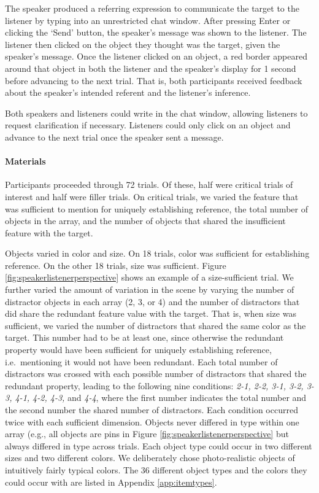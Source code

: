 \documentclass[11pt]{article}
\newcommand{\figref}[1]{Figure \ref{#1}}
\newcommand{\appref}[1]{Appendix \ref{#1}}
\begin{document}
The speaker produced a referring expression to communicate the target to the listener by typing into an unrestricted chat window. After pressing Enter or clicking the `Send' button, the speaker's message was shown to the listener. The listener then clicked on the object they thought was the target, given the speaker's message.  Once the listener clicked on an object, a red border appeared around that object in both the listener and the speaker's display for 1 second before advancing to the next trial. That is, both participants received feedback about the speaker's intended referent and the listener's inference.

Both speakers and listeners could write in the chat window, allowing listeners to request clarification if necessary. Listeners could only click on an object and advance to the next trial once the speaker sent a message. 


\paragraph{Materials}

Participants proceeded through 72 trials. Of these, half were critical trials of interest and half were filler trials. On critical trials, we varied the feature that was sufficient to mention for uniquely establishing reference, the total number of objects in the array, and  the number of objects that shared the insufficient feature with the target. 

Objects varied in color and size. On 18 trials, color was sufficient for establishing reference. On the other 18 trials, size was sufficient. \figref{fig:speakerlistenerperspective} shows an example of a size-sufficient trial. We further varied the amount of variation in the scene by varying the number of distractor objects in each array (2, 3, or  4) and the number of distractors that did share the redundant feature value with the target. That is, when size was sufficient, we varied the number of distractors that shared the same color as the target. This number had to be at least one, since otherwise the redundant property would have been sufficient for uniquely establishing reference, i.e.~mentioning it would not have been redundant. Each total number of distractors was crossed with each possible number of distractors that shared the redundant property, leading to the following nine conditions: \emph{2-1, 2-2, 3-1, 3-2, 3-3, 4-1, 4-2, 4-3,} and \emph{4-4}, where the first number indicates the total number and the second number the shared number of distractors. Each condition occurred twice with each sufficient dimension. Objects never differed in type within one array (e.g., all objects are pins in \figref{fig:speakerlistenerperspective} but always differed in type across trials. Each object type could occur in two different sizes and two different colors. We deliberately chose photo-realistic objects of intuitively fairly typical colors. The 36 different object types and the colors they could occur with are listed in \appref{app:itemtypes}. 
\end{document}
